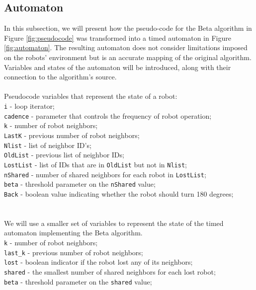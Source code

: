 \subsection{Automaton}
In this subsection, we will present how the pseudo-code for the Beta algorithm in Figure \ref{fig:pseudocode} was transformed into a timed automaton in Figure \ref{fig:automaton}. The resulting automaton does not consider limitations imposed on the robots' environment but is an accurate mapping of the original algorithm. Variables and states of the automaton will be introduced, along with their connection to the algorithm's source.
\\\\
Pseudocode variables that represent the state of a robot:\\
\texttt{i} - loop iterator;\\
\texttt{cadence} - parameter that controls the frequency of robot operation;\\
\texttt{k} - number of robot neighbors;\\
\texttt{LastK} - previous number of robot neighbors;\\
\texttt{Nlist} - list of neighbor ID's;\\
\texttt{OldList} - previous list of neighbor IDs;\\
\texttt{LostList} - list of IDs that are in \texttt{OldList} but not in \texttt{Nlist};\\
\texttt{nShared} - number of shared neighbors for each robot in \texttt{LostList};\\
\texttt{beta} - threshold parameter on the \texttt{nShared} value;\\
\texttt{Back} - boolean value indicating whether the robot should turn 180 degrees;\\
\\\\
We will use a smaller set of variables to represent the state of the timed automaton implementing the Beta algorithm.\\
\texttt{k} - number of robot neighbors;\\
\texttt{last\_k} - previous number of robot neighbors;\\
\texttt{lost} - boolean indicator if the robot lost any of its neighbors;\\
\texttt{shared} - the smallest number of shared neighbors for each lost robot;\\
\texttt{beta} - threshold parameter on the \texttt{shared} value;\\
